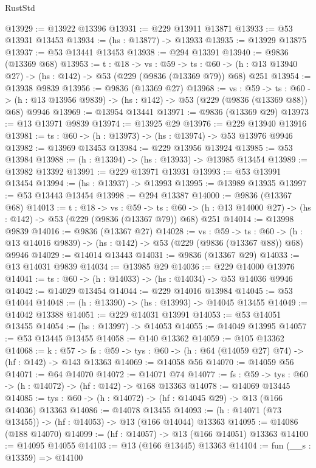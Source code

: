 \begin{lexlean}{RustStd}
\begin{coremodule}
@13929 := @13922 @13396
@13931 := @229 @13911 @13871
@13933 := @53 @13931 @13453
@13934 := (hs : @13877) -> @13933
@13935 := @13929 @13875
@13937 := @53 @13441 @13453
@13938 := @294 @13391
@13940 := @9836 (@13369 @68)
@13953 := {t : @18} ->
  {vs : @59} ->
  {ts : @60} -> (h : @13 @13940 @27) -> (hs : @142) -> @53 (@229 (@9836 (@13369 @79)) @68) @251
@13954 := @13938 @9839
@13956 := @9836 (@13369 @27)
@13968 := {vs : @59} ->
  {ts : @60} -> (h : @13 @13956 @9839) -> (hs : @142) -> @53 (@229 (@9836 (@13369 @88)) @68) @9946
@13969 := @13954 @13441
@13971 := @9836 (@13369 @29)
@13973 := @13 @13971 @9839
@13974 := @13925 @29
@13976 := @229 @13940 @13916
@13981 := {ts : @60} -> (h : @13973) -> (hs : @13974) -> @53 @13976 @9946
@13982 := @13969 @13453
@13984 := @229 @13956 @13924
@13985 := @53 @13984
@13988 := (h : @13394) -> (hs : @13933) -> @13985 @13454
@13989 := @13982 @13392
@13991 := @229 @13971 @13931
@13993 := @53 @13991 @13454
@13994 := (hs : @13937) -> @13993
@13995 := @13989 @13935
@13997 := @53 @13443 @13454
@13998 := @294 @13387
@14000 := @9836 (@13367 @68)
@14013 := {t : @18} ->
  {vs : @59} ->
  {ts : @60} -> (h : @13 @14000 @27) -> (hs : @142) -> @53 (@229 (@9836 (@13367 @79)) @68) @251
@14014 := @13998 @9839
@14016 := @9836 (@13367 @27)
@14028 := {vs : @59} ->
  {ts : @60} -> (h : @13 @14016 @9839) -> (hs : @142) -> @53 (@229 (@9836 (@13367 @88)) @68) @9946
@14029 := @14014 @13443
@14031 := @9836 (@13367 @29)
@14033 := @13 @14031 @9839
@14034 := @13985 @29
@14036 := @229 @14000 @13976
@14041 := {ts : @60} -> (h : @14033) -> (hs : @14034) -> @53 @14036 @9946
@14042 := @14029 @13454
@14044 := @229 @14016 @13984
@14045 := @53 @14044
@14048 := (h : @13390) -> (hs : @13993) -> @14045 @13455
@14049 := @14042 @13388
@14051 := @229 @14031 @13991
@14053 := @53 @14051 @13455
@14054 := (hs : @13997) -> @14053
@14055 := @14049 @13995
@14057 := @53 @13445 @13455
@14058 := @140 @13362
@14059 := @105 @13362
@14068 := {k : @57} ->
  {fs : @59} -> {tys : @60} -> (h : @64 (@14059 @27) @74) -> (hf : @142) -> @143 @13363
@14069 := @14058 @56
@14070 := @14059 @56
@14071 := @64 @14070
@14072 := @14071 @74
@14077 := {fs : @59} -> {tys : @60} -> (h : @14072) -> (hf : @142) -> @168 @13363
@14078 := @14069 @13445
@14085 := {tys : @60} -> (h : @14072) -> (hf : @14045 @29) -> @13 (@166 @14036) @13363
@14086 := @14078 @13455
@14093 := (h : @14071 (@73 @13455)) -> (hf : @14053) -> @13 (@166 @14044) @13363
@14095 := @14086 (@188 @14070)
@14099 := (hf : @14057) -> @13 (@166 @14051) @13363
@14100 := @14095 @14055
@14103 := @13 (@166 @13445) @13363
@14104 := fun (__s : @13359) => @14100

\end{coremodule}
\end{lexlean}

